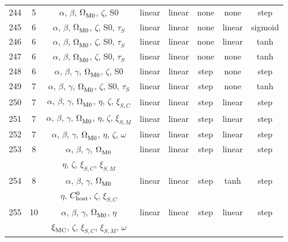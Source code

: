 \begin{longtable}{c c c c c c c c}
    244 & 5 & $\alpha$, $\beta$, $\Omega_{\rm M0}^{}$, $\zeta$, S0 & linear & linear & none & none & step \\
    245 & 6 & $\alpha$, $\beta$, $\Omega_{\rm M0}^{}$, $\zeta$, S0, $\tau_S^{}$ & linear & linear & none & linear & sigmoid \\
    246 & 6 & $\alpha$, $\beta$, $\Omega_{\rm M0}^{}$, $\zeta$, S0, $\tau_S^{}$ & linear & linear & none & linear & tanh \\
    247 & 6 & $\alpha$, $\beta$, $\Omega_{\rm M0}^{}$, $\zeta$, S0, $\tau_S^{}$ & linear & linear & none & none & tanh \\
    248 & 6 & $\alpha$, $\beta$, $\gamma$, $\Omega_{\rm M0}^{}$, $\zeta$, S0 & linear & linear & step & none & step \\
    249 & 7 & $\alpha$, $\beta$, $\gamma$, $\Omega_{\rm M0}^{}$, $\zeta$, S0, $\tau_S^{}$ & linear & linear & step & none & tanh \\
    250 & 7 & $\alpha$, $\beta$, $\gamma$, $\Omega_{\rm M0}^{}$, $\eta$, $\zeta$, $\xi_{S,C}^{}$ & linear & linear & step & linear & step \\
    251 & 7 & $\alpha$, $\beta$, $\gamma$, $\Omega_{\rm M0}^{}$, $\eta$, $\zeta$, $\xi_{S,M}^{}$ & linear & linear & step & linear & step \\
    252 & 7 & $\alpha$, $\beta$, $\gamma$, $\Omega_{\rm M0}^{}$, $\eta$, $\zeta$, $\omega$ & linear & linear & step & linear & step \\
    253 & 8 & $\alpha$, $\beta$, $\gamma$, $\Omega_{\rm M0}^{}$ & linear & linear & step & linear & step \\
    \multicolumn{1}{c}{} & \multicolumn{1}{c}{} & $\eta$, $\zeta$, $\xi_{S,C}^{}$, $\xi_{S,M}^{}$ & \multicolumn{1}{c}{} & \multicolumn{1}{c}{} & \multicolumn{1}{c}{} & \multicolumn{1}{c}{} & \multicolumn{1}{c}{} \\
    254 & 8 & $\alpha$, $\beta$, $\gamma$, $\Omega_{\rm M0}^{}$ & linear & linear & step & tanh & step \\
    \multicolumn{1}{c}{} & \multicolumn{1}{c}{} & $\eta$, $C_{\rm host}^{0}$, $\zeta$, $\xi_{S,C}^{}$ & \multicolumn{1}{c}{} & \multicolumn{1}{c}{} & \multicolumn{1}{c}{} & \multicolumn{1}{c}{} & \multicolumn{1}{c}{} \\
    255 & 10 & $\alpha$, $\beta$, $\gamma$, $\Omega_{\rm M0}^{}$, $\eta$ & linear & linear & step & linear & step \\
    \multicolumn{1}{c}{} & \multicolumn{1}{c}{} & $\xi_{\rm MC}^{}$, $\zeta$, $\xi_{S,C}^{}$, $\xi_{S,M}^{}$, $\omega$ & \multicolumn{1}{c}{} & \multicolumn{1}{c}{} & \multicolumn{1}{c}{} & \multicolumn{1}{c}{} & \multicolumn{1}{c}{} \\

\end{longtable}
